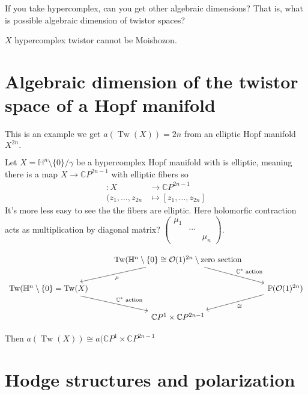 \begin{question}\leavevmode
	If you take hypercomplex, can you get other algebraic dimensions? That is, what is possible algebraic dimension of twistor spaces?
\end{question}

\begin{thm}\leavevmode
	$X$ hypercomplex twistor cannot be Moishozon.
\end{thm}

\section{Algebraic dimension of the twistor space of a Hopf manifold}
{\color{5}This is an example we get $a(\operatorname{Tw}(X))=2n$ from an elliptic Hopf manifold $X^{2n}.$}

Let $X=\mathbb{H}^n\setminus \{0\} /\gamma$ be a hypercomplex Hopf manifold with is elliptic, meaning there is a map $X\to \mathbb{C}P^{2n-1}$ with elliptic fibers so
\begin{align*}
	:X  &\longrightarrow \mathbb{C}P^{2n-1} \\
	(z_1,\ldots,z_{2n} &\longmapsto [z_1,\ldots,z_{2n}]
\end{align*}
It's more less easy to see the the fibers are elliptic. Here holomorfic contraction acts as multiplication by diagonal matrix?  $\begin{pmatrix} \mu_1&& \\& \cdots & \\&&\mu_{n}\end{pmatrix} $.

\[\begin{tikzcd}
	&\operatorname{Tw}(\mathbb{H}^n\setminus \{0\} \cong \mathcal{O}(1)^{2n}\setminus \text{zero section} \arrow[dl,"\mu"]\arrow[dr,"\mathbb{C}^*\text{ action}" ]\\
	\operatorname{Tw}(\mathbb{H}^n\setminus \{0\}= \operatorname{Tw}(X)\arrow[dr,"\mathbb{C}^*\text{ action} "]&  &  \mathbb{P}(\mathcal{O}(1)^{2n})\arrow[dl,"\cong "]\\
	&\mathbb{C}P^{1}\times \mathbb{C}P^{2n-1}
\end{tikzcd}\]

Then $a(\operatorname{Tw}(X))\cong a(\mathbb{C}P^{1}\times \mathbb{C}P^{2n-1}$

\section{Hodge structures and polarization}

